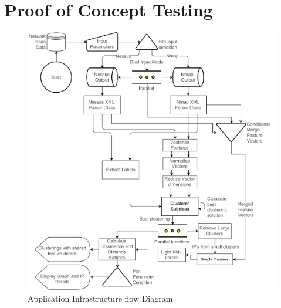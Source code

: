 \section{Proof of Concept Testing}
\label{sec:section4}


\begin{figure}
\centering
\includegraphics[width=4.5in]{./Figures/flow.pdf}
\caption{Application Infrastructure flow Diagram}
\label{flow}
\end{figure}